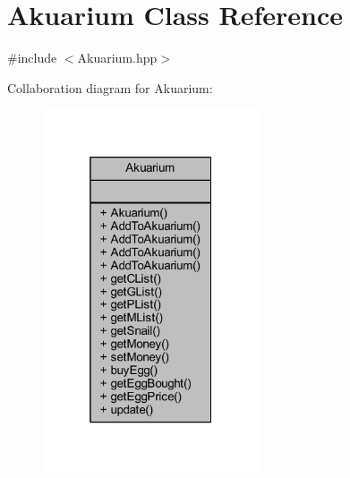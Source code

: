 \hypertarget{class_akuarium}{}\section{Akuarium Class Reference}
\label{class_akuarium}


{\ttfamily \#include $<$Akuarium.\+hpp$>$}



Collaboration diagram for Akuarium\+:
\nopagebreak
\begin{figure}[H]
\begin{center}
\leavevmode
\includegraphics[width=181pt]{class_akuarium__coll__graph}
\end{center}
\end{figure}

